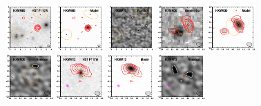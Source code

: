 \documentclass[iop]{emulateapj}
\begin{document}
\begin{figure}[!tbp]
\begin{centering}
\includegraphics[width=0.162\textwidth]{../Figures/modelfit/HXMM05_optical_bestfit.pdf}
\includegraphics[width=0.162\textwidth]{../Figures/modelfit/HXMM05_model_bestfit.pdf}
\includegraphics[width=0.162\textwidth]{../Figures/modelfit/HXMM05_residual_bestfit.pdf}
\includegraphics[width=0.162\textwidth]{../Figures/modelfit/HXMM30_optical_bestfit.pdf}
\includegraphics[width=0.162\textwidth]{../Figures/modelfit/HXMM30_model_bestfit.pdf}
\includegraphics[width=0.162\textwidth]{../Figures/modelfit/HXMM30_residual_bestfit.pdf}
\includegraphics[width=0.162\textwidth]{../Figures/modelfit/HXMM12_optical_bestfit.pdf}
\includegraphics[width=0.162\textwidth]{../Figures/modelfit/HXMM12_model_bestfit.pdf}
\includegraphics[width=0.162\textwidth]{../Figures/modelfit/HXMM12_residual_bestfit.pdf}
\end{centering}


\end{figure}
\end{document}
